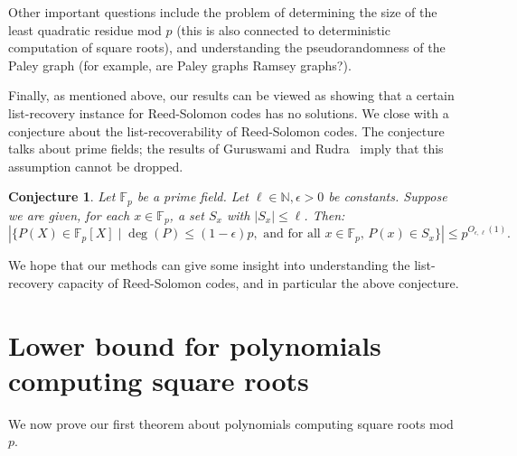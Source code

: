 \documentclass{article}
\newtheorem{conjecture}{Conjecture}[section]
\newcommand{\F}{\mathbb{F}}
\begin{document}
Other important questions include the problem of determining the size of the least quadratic residue mod $p$ (this is also connected to deterministic computation of square roots), and understanding the pseudorandomness of the Paley graph (for example, are Paley graphs Ramsey graphs?).

Finally, as mentioned above, our results can be viewed as showing that a certain list-recovery instance for Reed-Solomon codes has no solutions. 
We close with a conjecture about the list-recoverability of Reed-Solomon codes.
The conjecture talks about prime fields; the results of Guruswami and Rudra~\cite{GR-listrecovery} imply that this assumption cannot be dropped.

\begin{conjecture}
 Let $\F_p$ be a prime field. Let $\ell \in \mathbb N, \epsilon >0$ be constants. Suppose we are given, 
 for each $x \in \F_p$, a set $S_x$ with $|S_x| \leq \ell$. 
 Then:
 $$ \left|\{ P(X) \in \F_p[X] \mid \deg(P) \leq (1-\epsilon) p, \mbox{ and for all $x \in \F_p$, } P(x) \in S_x \}\right| \leq p^{O_{\epsilon, \ell}(1)}.$$
\end{conjecture}

We hope that our methods can give some insight into understanding the list-recovery capacity of Reed-Solomon codes, and in particular the above conjecture.

\section{Lower bound for polynomials computing square roots}

We now prove our first theorem about polynomials computing square roots mod $p$.
\end{document}
